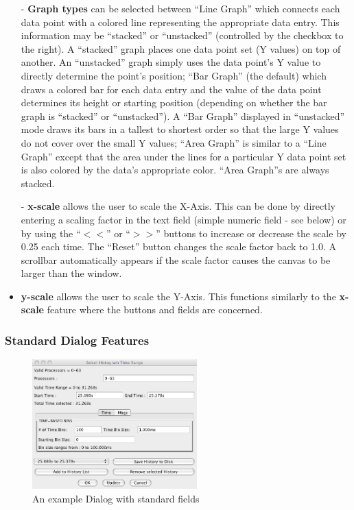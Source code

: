 \documentclass[10pt]{article}
\begin{document}
\begin{itemize}
\item[-] {\bf Graph types} can be selected between ``Line Graph'' which
connects each data point with a colored line representing the
appropriate data entry. This information may be ``stacked'' or
``unstacked'' (controlled by the checkbox to the right). A ``stacked''
graph places one data point set (Y values) on top of another. An
``unstacked'' graph simply uses the data point's Y value to directly
determine the point's position; ``Bar Graph'' (the default) which
draws a colored bar for each data entry and the value of the data
point determines its height or starting position (depending on whether
the bar graph is ``stacked'' or ``unstacked''). A ``Bar Graph''
displayed in ``unstacked'' mode draws its bars in a tallest to
shortest order so that the large Y values do not cover over the small
Y values; ``Area Graph'' is similar to a ``Line Graph'' except that the
area under the lines for a particular Y data point set is also colored
by the data's appropriate color. ``Area Graph''s are always stacked.
\item[-] {\bf x-scale} allows the user to scale the X-Axis. This can be
done by directly entering a scaling factor in the text field (simple
numeric field - see below) or by using the ``$<<$'' or ``$>>$'' buttons
to increase or decrease the scale by 0.25 each time. The ``Reset'' button
changes the scale factor back to 1.0. A scrollbar automatically appears
if the scale factor causes the canvas to be larger than the window.
\item {\bf y-scale} allows the user to scale the Y-Axis. This functions 
similarly to the {\bf x-scale} feature where the buttons and fields are
concerned.
\end{itemize}

\subsubsection{Standard Dialog Features}

\begin{figure}[htb]
\center
\includegraphics[width=2.5in]{fig/standard_dialog}
\caption{An example Dialog with standard fields}
\label{standard dialog}
\end{figure}
\end{document}
